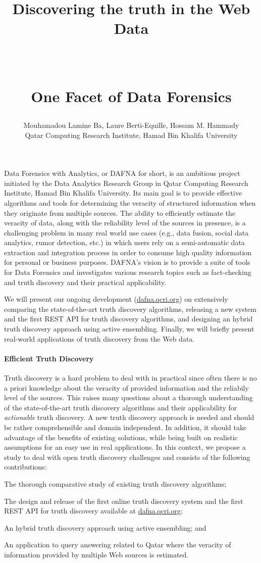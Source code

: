 \documentclass[paper=a4, fontsize=11pt]{scrartcl}	%
\title{ \vspace{-1in} 	\usefont{OT1}{bch}{b}{n}
		\huge \strut Discovering the truth in the Web Data\strut \\
		\Large \bfseries \strut One Facet of Data Forensics\strut
}
\author{ 									\usefont{OT1}{bch}{m}{n}
        Mouhamadou Lamine Ba, Laure Berti-Equille, Hossam M. Hammady\\		\usefont{OT1}{bch}{m}{n}
        Qatar Computing Research Institute, Hamad Bin Khalifa University\\	\usefont{OT1}{bch}{m}{n}
}
\date{}
\numberwithin{equation}{section}															%
\numberwithin{figure}{section}																%
\numberwithin{table}{section}																%
\begin{document}
\maketitle
 \vspace*{-1.5cm}
 Data Forensics with Analytics, or DAFNA for short, is an ambitious project initiated by the Data Analytics Research Group in Qatar Computing Research
 Institute, Hamad Bin Khalifa University. Its main goal is to provide effective algorithms and tools for determining the veracity of structured information when they originate
 from  multiple sources. The ability to efficiently estimate the veracity of data, along with the reliability level of the sources in presence, is a challenging
 problem in many real world use cases (e.g., data fusion, social data analytics, rumor detection, etc.) in which users rely on a semi-automatic data extraction
 and integration process in order to consume high quality information for personal or business purposes. DAFNA's vision is to provide a suite of tools for Data
 Forensics and investigates various research topics such as fact-checking and truth discovery and their practical applicability.

We will present our ongoing development (\url{dafna.qcri.org}) on extensively comparing the state-of-the-art truth discovery algorithms, releasing a new system and 
the first REST API for truth discovery algorithms, and designing an hybrid truth discovery approach using active ensembling. Finally, we will briefly present real-world
applications of truth discovery from the Web data.
 
 \paragraph*{Efficient Truth Discovery}Truth discovery is a hard problem to deal with in practical since often there is no a priori knowledge about the veracity of provided 
 information and the reliabily level of the sources. This raises many questions about a thorough understanding of the state-of-the-art truth discovery algorithms and their applicability
 for \emph{actionable} truth discovery. A new truth discovery approach is needed and should be rather comprehensible and domain independent. In addition, it should take advantage of the 
 benefits of existing solutions, while being built on realistic assumptions for an easy use in real applications. In this context, we propose a study to deal with open truth discovery challenges 
 and consists of the following contributions:
 \begin{inparaenum}[(i)]
  \item The thorough comparative study of existing truth discovery algorithms;
  \item The design and release of the first online truth discovery system and 
  the first REST API for truth discovery available at \url{dafna.qcri.org};
  \item An hybrid truth discovery approach using active ensembling; and 
  \item An application to query answering related to Qatar where the veracity of information provided by multiple Web sources is estimated.
 \end{inparaenum}
 \cite{*}
 
 
\end{document}
